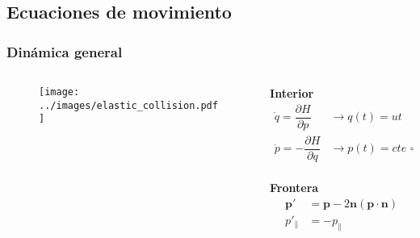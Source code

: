 \documentclass{beamer}
\begin{document}
\subsection{Ecuaciones de movimiento}

\begin{frame}
    \frametitle[prueb1]{Dinámica general}
    \begin{columns}
        \begin{column}{0.5\textwidth}
            \begin{figure}
                \centering
                \texttt{[image: ../images/elastic\_collision.pdf]}
            \end{figure}         
        \end{column}
        \begin{column}{0.5\textwidth}
            \centering
            \textbf{Interior}
            \begin{align*}
                \dot{q} = \dfrac{\partial H}{\partial p} &\rightarrow q(t) = ut \\
                \dot{p} = -\dfrac{\partial H}{\partial q} &\rightarrow p(t) = cte = mu
            \end{align*}\\
            \vspace{0.6cm}
            \textbf{Frontera}
            \begin{align*}
                \mathbf{p}' &= \mathbf{p} - 2\mathbf{n}(\mathbf{p} \cdot \mathbf{n}) \\
                p'_\parallel &= -p_\parallel
            \end{align*}
        \end{column}
    \end{columns}
\end{frame}
\end{document}
